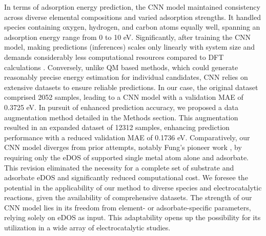 In terms of adsorption energy prediction, the CNN model maintained consistency across diverse elemental compositions and varied adsorption strengths.
It handled species containing oxygen, hydrogen, and carbon atoms equally well, spanning an adsorption energy range from 0 to 10 eV.
Significantly, after training the CNN model, making predictions (inferences) scales only linearly with system size and demands considerably less computational resources compared to DFT calculations \cite{chandrasekaran2019solving}.
Conversely, unlike QM based methods, which could generate reasonably precise energy estimation for individual candidates, CNN relies on extensive datasets to ensure reliable predictions.
In our case, the original dataset comprised 2052 samples, leading to a CNN model with a validation MAE of 0.3725 eV.
In pursuit of enhanced prediction accuracy, we proposed a data augmentation method detailed in the Methods section.
This augmentation resulted in an expanded dataset of 12312 samples, enhancing prediction performance with a reduced validation MAE of 0.1736 eV.
Comparatively, our CNN model diverges from prior attempts, notably Fung's pioneer work \cite{fung2021machine}, by requiring only the eDOS of supported single metal atom alone and adsorbate.
This revision eliminated the necessity for a complete set of substrate and adsorbate eDOS and significantly reduced computational cost.
We foresee the potential in the applicability of our method to diverse species and electrocatalytic reactions, given the availability of comprehensive datasets.
The strength of our CNN model lies in its freedom from element- or adsorbate-specific parameters, relying solely on eDOS as input.
This adaptability opens up the possibility for its utilization in a wide array of electrocatalytic studies.
